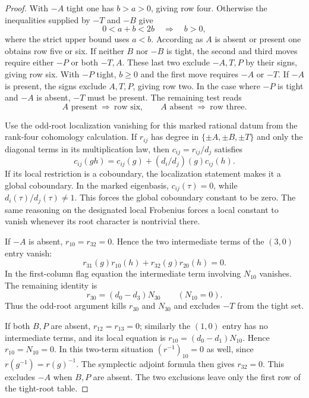 \begin{proof}
With \(-A\) tight
one has \(b>a>0\), giving row four. Otherwise the inequalities supplied by \(-T\) and \(-B\) give
\[
 0<a+b<2b\quad\Longrightarrow\quad b>0,
\]
where the strict upper bound uses \(a<b\).
According as \(A\) is absent or present one obtains
row five or six. If neither \(B\) nor \(-B\) is tight,
the second and third moves require either \(-P\) or
both \(-T,A\). These last two exclude \(-A,T,P\)
by their signs, giving row six. With \(-P\) tight,
\(b\ge0\) and the first move requires \(-A\) or \(-T\).
If \(-A\) is present, the signs exclude \(A,T,P\),
giving row two. In the case where \(-P\) is tight and \(-A\) is absent, \(-T\) must be present. The remaining test reads
\[
 A\text{ present}\ \Longrightarrow\ \text{row six},\qquad A\text{ absent}\ \Longrightarrow\ \text{row three}.
\]

Use the odd-root localization vanishing for this marked
rational datum from the rank-four cohomology calculation.
If \(r_{ij}\) has degree in \(\{\pm A,\pm B,\pm T\}\) and
only the diagonal terms in its multiplication law, then
\(c_{ij}=r_{ij}/d_j\) satisfies
\[
    c_{ij}(gh)=c_{ij}(g)+
                  (d_i/d_j)(g)c_{ij}(h).
\]
If its local restriction is a coboundary, the localization
statement makes it a global coboundary. In the marked
eigenbasis, \(c_{ij}(\tau)=0\), while \(d_i(\tau)/d_j(\tau)\ne1\).
This forces the global coboundary constant to be zero.
The same reasoning on the designated local Frobenius
forces a local constant to vanish whenever its root
character is nontrivial there.

If \(-A\) is absent, \(r_{10}=r_{32}=0\). Hence the two
intermediate terms of the \((3,0)\) entry vanish:
\[
 r_{31}(g)r_{10}(h)+r_{32}(g)r_{20}(h)=0.
\]
In the first-column flag equation the intermediate term involving \(N_{10}\) vanishes. The remaining identity is
\[
 r_{30}=(d_0-d_3)N_{30}\qquad(N_{10}=0).
\]
Thus the odd-root argument kills \(r_{30}\) and \(N_{30}\)
and excludes \(-T\) from the tight set.

If both \(B,P\)
are absent, \(r_{12}=r_{13}=0\); similarly the \((1,0)\)
entry has no intermediate terms, and its local equation
is \(r_{10}=(d_0-d_1)N_{10}\). Hence \(r_{10}=N_{10}=0\).
In this two-term situation \((r^{-1})_{10}=0\) as well,
since \(r(g^{-1})=r(g)^{-1}\). The symplectic adjoint formula
then gives \(r_{32}=0\). This excludes \(-A\) when \(B,P\)
are absent. The two exclusions leave only the first row
of the tight-root table.


\end{proof}
